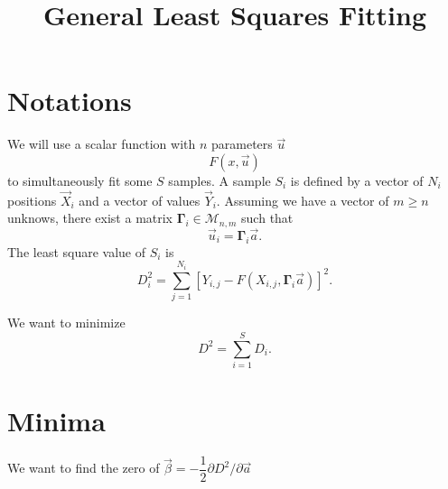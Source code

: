 \documentclass[aps,twocolumn]{revtex4}
\newcommand{\mymat}[1]{\boldsymbol{#1}}
\begin{document}
\title{General Least Squares Fitting}
\maketitle

\section{Notations}
We will use a scalar function with $n$ parameters $\vec{u}$
\begin{equation}
	F(x,\vec{u})
\end{equation}
to simultaneously fit some $S$ samples.
A sample $S_i$ is defined by a vector of $N_i$ positions $\vec{X}_i$ and
a vector of values $\vec{Y}_i$.
Assuming we have a vector of $m\geq n$ unknows, there exist a
matrix $\mymat{\Gamma}_i\in\mathcal{M}_{n,m}$
such that
\begin{equation}
	\vec{u}_i = \mymat{\Gamma}_i \vec{a}.
\end{equation}
The least square value of $S_i$ is
\begin{equation}
	D^2_i = \sum_{j=1}^{N_i} \left[ Y_{i,j} - F\left(X_{i,j},\mymat{\Gamma}_i \vec{a}\right)\right]^2.
\end{equation}

We want to minimize 
\begin{equation}
	D^2 = \sum_{i=1}^{S} D_i.
\end{equation}

\section{Minima}
We want to find the zero of $\vec{\beta}=-\dfrac{1}{2}\partial D^2 / \partial \vec{a}$
\end{document}
